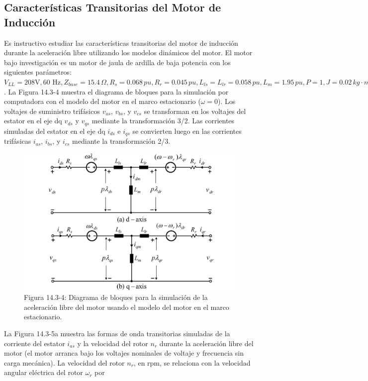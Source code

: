 \documentclass[letterpaper,12pt]{article} %
\begin{document}
\subsection{Características Transitorias del Motor de Inducción}

Es instructivo estudiar las características transitorias del motor de inducción durante la aceleración libre utilizando los modelos dinámicos del motor. El motor bajo investigación es un motor de jaula de ardilla de baja potencia con los siguientes parámetros: \(V_{LL} = 208 \text{V}, 60\text{ Hz}, Z_{base} = 15.4 \, \Omega, R_s = 0.068 \, pu, R_r = 0.045 \, pu, L_{ls} = L_{lr} = 0.058 \, pu, L_m = 1.95 \, pu, P = 1, J = 0.02 \, kg \cdot m^2\). La Figura 14.3-4 muestra el diagrama de bloques para la simulación por computadora con el modelo del motor en el marco estacionario (\(\omega = 0\)). Los voltajes de suministro trifásicos \(v_{as}\), \(v_{bs}\), y \(v_{cs}\) se transforman en los voltajes del estator en el eje dq \(v_{ds}\) y \(v_{qs}\) mediante la transformación 3/2. Las corrientes simuladas del estator en el eje dq \(i_{ds}\) e \(i_{qs}\) se convierten luego en las corrientes trifásicas \(i_{as}\), \(i_{bs}\), y \(i_{cs}\) mediante la transformación 2/3.

\begin{figure}[ht]
    \centering
    \includegraphics{graficos/img05.jpg} 
    \caption{Figura 14.3-4: Diagrama de bloques para la simulación de la aceleración libre del motor usando el modelo del motor en el marco estacionario.}
    \label{fig:14.3-4}
\end{figure}
\FloatBarrier  

La Figura 14.3-5a muestra las formas de onda transitorias simuladas de la corriente del estator \(i_{as}\) y la velocidad del rotor \(n_r\) durante la aceleración libre del motor (el motor arranca bajo los voltajes nominales de voltaje y frecuencia sin carga mecánica). La velocidad del rotor \(n_r\), en rpm, se relaciona con la velocidad angular eléctrica del rotor \(\omega_r\) por
\end{document}
